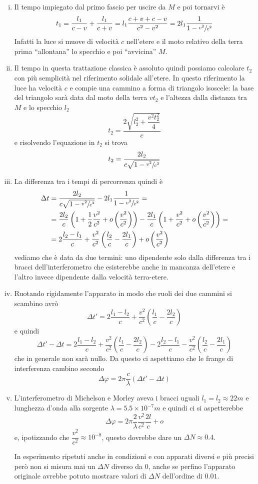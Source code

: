 \documentclass[12pt,a4paper,titlepage, twoside, openright]{book}
\numberwithin{equation}{chapter}
\begin{document}
\begin{enumerate}[i.]
\item Il tempo impiegato dal primo fascio per uscire da $M$ e poi tornarvi è
\[
t_1=\dfrac{l_1}{c-v}+\dfrac{l_1}{c+v}=l_1\dfrac{c+v+c-v}{c^2-v^2}=2l_1\dfrac{1}{1-\sfrac{v^2}{c^2}}
\]
Infatti la luce si muove di velocità $c$ nell'etere e il moto relativo della terra prima ``allontana'' lo specchio e poi ``avvicina'' $M$. 
\item Il tempo in questa trattazione classica è assoluto quindi possiamo calcolare $t_2$ con più semplicità nel riferimento solidale all'etere. In questo riferimento la luce ha velocità $c$ e compie una cammino a forma di triangolo isoscele: la base del triangolo sarà data dal moto della terra $vt_2$ e l'altezza dalla distanza tra $M$ e lo specchio $l_2$
\[
t_2=\dfrac{2\sqrt{l_2^2+\dfrac{v^2t_2^2}{4}}}{c}
\]
e risolvendo l'equazione in $t_2$ si trova
\[
t_2=\dfrac{2l_2}{c\sqrt{1-\sfrac{v^2}{c^2}}}
\]
\item La differenza tra i tempi di percorrenza quindi è
\begin{align*}
\Delta t &= \dfrac{2l_2}{c\sqrt{1-\sfrac{v^2}{c^2}}} - 2l_1\dfrac{1}{1-\sfrac{v^2}{c^2}} =\\
&= \dfrac{2l_2}{c}\left(1+\dfrac{1}{2}\dfrac{v^2}{c^2}+o\left(\dfrac{v^2}{c^2}\right)\right)-\dfrac{2l_1}{c}\left(1+\dfrac{v^2}{c^2}+o\left(\dfrac{v^2}{c^2}\right)\right) =\\
&= 2\dfrac{l_2-l_1}{c} + \dfrac{v^2}{c^2}\left(\dfrac{l_2}{c}-\dfrac{2l_1}{c}\right)+o\left(\dfrac{v^2}{c^2}\right)
\end{align*}
vediamo che è data da due termini: uno dipendente solo dalla differenza tra i bracci dell'interferometro che esisterebbe anche in mancanza dell'etere e l'altro invece dipendente dalla velocità terra-etere.
\item Ruotando rigidamente l'apparato in modo che ruoli dei due cammini si scambino avrò
\[
\Delta t'= 2\dfrac{l_1-l_2}{c} + \dfrac{v^2}{c^2}\left(\dfrac{l_1}{c}-\dfrac{2l_2}{c}\right)
\]
e quindi
\[
\Delta t' - \Delta t =2\dfrac{l_1-l_2}{c} + \dfrac{v^2}{c^2}\left(\dfrac{l_1}{c}-\dfrac{2l_2}{c}\right) - 2\dfrac{l_2-l_1}{c} - \dfrac{v^2}{c^2}\left(\dfrac{l_2}{c}-\dfrac{2l_1}{c}\right)
\]
che in generale non sarà nullo. Da questo ci aspettiamo che le frange di interferenza cambino secondo
\[
\Delta \varphi = 2\pi \dfrac{c}{\lambda} (\Delta t' - \Delta t)
\]
\item L'interferometro di Michelson e Morley aveva i bracci uguali $l_1=l_2\approx 22m$ e lunghezza d'onda alla sorgente $\lambda = 5.5\times 10^{-7}m$ e quindi ci si aspetterebbe
\[
\Delta \varphi = 2\pi\dfrac{2}{\lambda}\dfrac{v^2}{c^2}\dfrac{2l}{c}+o
\]
e, ipotizzando che $\dfrac{v^2}{c^2}\approx10^{-8}$, questo dovrebbe dare un $\Delta N\approx 0.4$.

In esperimento ripetuti anche in condizioni e con apparati diversi e più precisi però non si misura mai un $\Delta N$ diverso da $0$, anche se perfino l'apparato originale avrebbe potuto mostrare valori di $\Delta N$ dell'ordine di $0.01$.
\end{enumerate}
\end{document}
